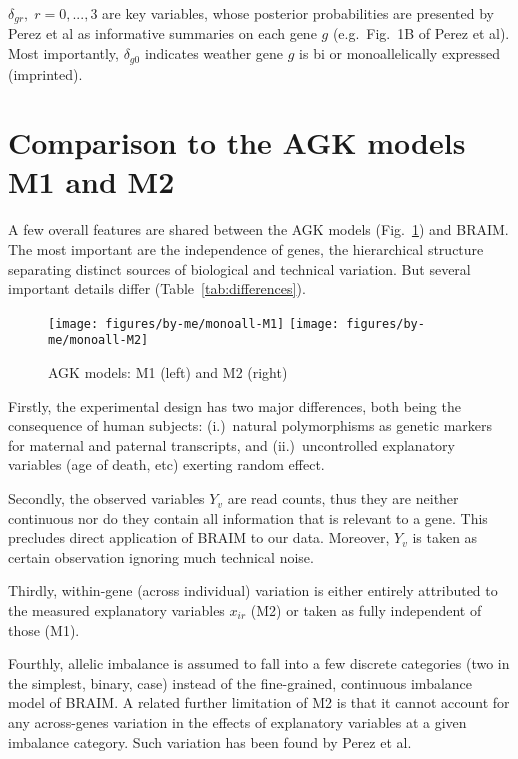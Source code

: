 \documentclass[letterpaper]{article}
\begin{document}
\(\delta_{gr},\; r=0,...,3\) are key variables, whose posterior
probabilities are presented by Perez et al as informative summaries on each
gene \(g\) (e.g.~Fig.~1B of Perez et al).  Most importantly,
\(\delta_{g0}\) indicates weather gene \(g\) is bi or monoallelically
expressed (imprinted).


\section{Comparison to the AGK models M1 and M2}

A few overall features are shared between the AGK models (Fig.~\ref{fig:agk}) and BRAIM.  The most
important are the independence of genes, the hierarchical structure separating
distinct sources of biological and technical variation.  But several important details
differ (Table~\ref{tab:differences}).

\begin{figure}
\begin{center}
\texttt{[image: figures/by-me/monoall-M1]}
\hspace{\fill}
\texttt{[image: figures/by-me/monoall-M2]}
\end{center}
\caption{AGK models: M1 (left) and M2 (right)}
\label{fig:agk}
\end{figure}

Firstly, the experimental design has two major differences, both being the
consequence of human subjects: (i.)~natural polymorphisms as genetic markers
for maternal and paternal transcripts, and (ii.)~uncontrolled explanatory
variables (age of death, etc) exerting random effect.

Secondly, the observed variables \(Y_v\) are read counts, thus they are
neither continuous nor do they contain all information that is relevant to a
gene. This precludes direct application of BRAIM to our data. Moreover,
\(Y_v\) is taken as certain observation ignoring much technical noise.

Thirdly, within-gene (across individual) variation is either entirely attributed
to the measured explanatory variables \(x_{ir}\) (M2) or taken as fully independent of
those (M1).

Fourthly, allelic imbalance is assumed to fall into a few discrete categories
(two in the simplest, binary, case) instead of the fine-grained, continuous
imbalance model of BRAIM.  A related further limitation of M2 is that it
cannot account for any across-genes variation in the effects of explanatory variables at a
given imbalance category.  Such variation has been found by Perez et al.
\end{document}
